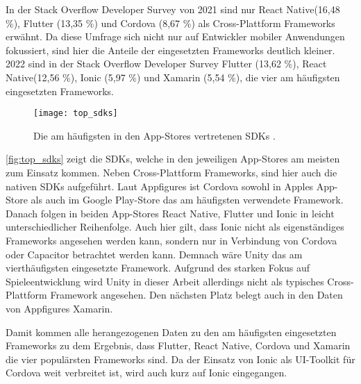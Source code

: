 In der Stack Overflow Developer Survey von 2021 \cite{Stackoverflow_2021} sind nur React Native(16,48 \%), Flutter (13,35 \%) und Cordova (8,67 \%) als Cross-Plattform Frameworks erwähnt.
Da diese Umfrage sich nicht nur auf Entwickler mobiler Anwendungen fokussiert, sind hier die Anteile der eingesetzten Frameworks deutlich kleiner.
2022 sind in der Stack Overflow Developer Survey \cite{Stackoverflow_2022} Flutter (13,62 \%), React Native(12,56 \%), Ionic (5,97 \%) und Xamarin (5,54 \%), die vier am häufigsten eingesetzten Frameworks.

\begin{figure}[ht]
  \centering
  \texttt{[image: top\_sdks]}
  \caption{Die am häufigsten in den App-Stores vertretenen \acp{SDK} \cite{Appfigures_TopSDKs}.}
  \label{fig:top_sdks}  
\end{figure}

\autoref{fig:top_sdks} zeigt die \acp{SDK}, welche in den jeweiligen App-Stores am meisten zum Einsatz kommen.
Neben Cross-Plattform Frameworks, sind hier auch die nativen \acp{SDK} aufgeführt.
Laut Appfigures \cite{Appfigures_TopSDKs} ist Cordova sowohl in Apples App-Store als auch im Google Play-Store das am häufigsten verwendete Framework.
Danach folgen in beiden App-Stores React Native, Flutter und Ionic in leicht unterschiedlicher Reihenfolge.
Auch hier gilt, dass Ionic nicht als eigenständiges Frameworks angesehen werden kann, sondern nur in Verbindung von Cordova oder Capacitor betrachtet werden kann.
Demnach wäre Unity das am vierthäufigsten eingesetzte Framework.
Aufgrund des starken Fokus auf Spieleentwicklung \cite{Unity} wird Unity in dieser Arbeit allerdings nicht als typisches Cross-Plattform Framework angesehen.
Den nächsten Platz belegt auch in den Daten von Appfigures Xamarin.

Damit kommen alle herangezogenen Daten zu den am häufigsten eingesetzten Frameworks zu dem Ergebnis, dass Flutter, React Native, Cordova und Xamarin die vier populärsten Frameworks sind.
Da der Einsatz von Ionic als UI-Toolkit für Cordova weit verbreitet ist, wird auch kurz auf Ionic eingegangen.





